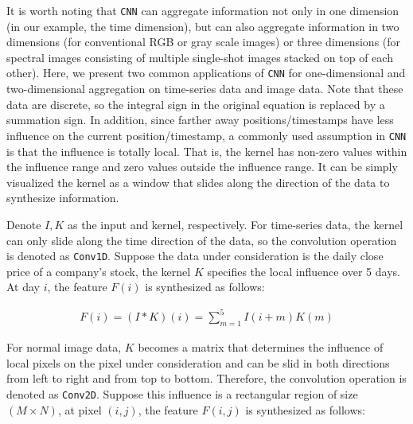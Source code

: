 It is worth noting that \verb|CNN| can aggregate information not only in one dimension (in our example, the time dimension), but can also aggregate information in two dimensions (for conventional RGB or gray scale images) or three dimensions (for spectral images consisting of multiple single-shot images stacked on top of each other). Here, we present two common applications of \verb|CNN| for one-dimensional and two-dimensional aggregation on time-series data and image data. Note that these data are discrete, so the integral sign in the original equation is replaced by a summation sign. In addition, since farther away positions/timestamps have less influence on the current position/timestamp, a commonly used assumption in \verb|CNN| is that the influence is totally local. That is, the kernel has non-zero values within the influence range and zero values outside the influence range. It can be simply visualized the kernel as a window that slides along the direction of the data to synthesize information.


Denote $I, K$ as the input and kernel, respectively. For time-series data, the kernel can only slide along the time direction of the data, so the convolution operation is denoted as \verb|Conv1D|. Suppose the data under consideration is the daily close price of a company's stock, the kernel $K$ specifies the local influence over 5 days. At day $i$, the feature $F(i)$ is synthesized as follows:

\begin{align}
    F(i) = (I*K)(i) = \sum_{m=1}^5{I(i+m) K(m)}
\end{align}


For normal image data, $K$ becomes a matrix that determines the influence of local pixels on the pixel under consideration and can be slid in both directions from left to right and from top to bottom. Therefore, the convolution operation is denoted as \verb|Conv2D|. Suppose this influence is a rectangular region of size $(M\times N)$, at pixel $(i,j)$, the feature $F(i,j)$ is synthesized as follows:

